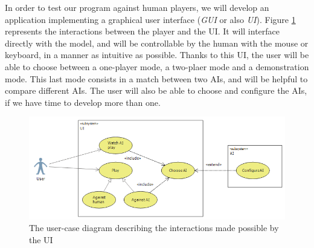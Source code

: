 In order to test our program against human players, we will develop an application implementing a graphical user interface (\emph{GUI} or also \emph{UI}).
Figure \ref{fig:UCD_Play} represents the interactions between the player and the UI.
It will interface directly with the model, and will be controllable by the human with the mouse or keyboard, in a manner as intuitive as possible.
Thanks to this UI, the user will be able to choose between a one-player mode, a two-plaer mode and a demonstration mode.
This last mode consists in a match between two AIs, and will be helpful to compare different AIs.
The user will also be able to choose and configure the AIs, if we have time to develop more than one.

\begin{figure}[!h]
\centering
\includegraphics[width=\textwidth]{2General_Architecture/2.1Behaviour_of_the_Game/Pictures/Application_UCD}
\caption{The user-case diagram describing the interactions made possible by the UI}
\label{fig:UCD_Play}
\end{figure}
